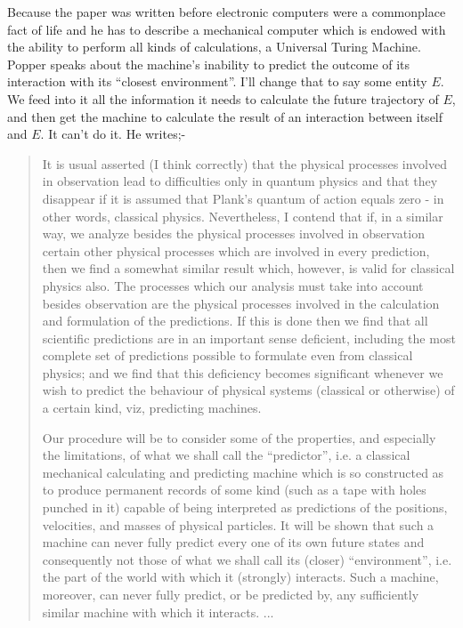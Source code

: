Because the paper was written before electronic computers were a commonplace fact of life and he
has to describe a mechanical computer which is endowed with the ability to perform all kinds of
calculations, a Universal Turing Machine. Popper speaks about the machine's inability to predict
the outcome of its interaction with its \enquote{closest environment}. I'll change that to say
some entity $E$. We feed into it all the information it needs to calculate the future trajectory
of $E$, and then get the machine to calculate the result of an interaction between itself and
$E$. It can't do it. He writes;-
\begin{quotation}
It is usual asserted (I think correctly) that the physical processes involved in observation
lead to difficulties only in quantum physics and that they disappear if it is assumed that
Plank's quantum of action equals zero - in other words, classical physics. Nevertheless, I
contend that if, in a similar way, we analyze besides the physical processes involved in
observation certain other physical processes which are involved in every prediction, then we
find a somewhat similar result which, however, is valid for classical physics also. The
processes which our analysis must take into account besides observation are the physical
processes involved in the calculation and formulation of the predictions. If this is done then
we find that all scientific predictions are in an important sense deficient, including the most
complete set of predictions possible to formulate even from classical physics; and we find that
this deficiency becomes significant whenever we wish to predict the behaviour of physical
systems (classical or otherwise) of a certain kind, viz, predicting machines.

Our procedure will be to consider some of the properties, and especially the limitations, of
what we shall call the \enquote{predictor}, i.e. a classical mechanical calculating and
predicting machine which is so constructed as to produce permanent records of some kind (such as
a tape with holes punched in it) capable of being interpreted as predictions of the positions,
velocities, and masses of physical particles. It will be shown that such a machine can never
fully predict every one of its own future states and consequently not those of what we shall
call its (closer) \enquote{environment}, i.e. the part of the world with which it (strongly)
interacts. Such a machine, moreover, can never fully predict, or be predicted by, any
sufficiently similar machine with which it interacts. ...
  \par
\hfill \autocite[p.~118]{Popper1950a}
\end{quotation}
